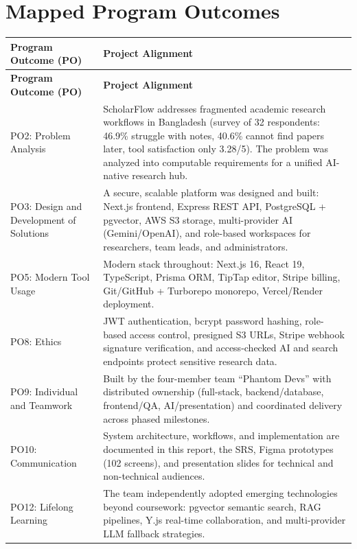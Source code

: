 \section*{Mapped Program Outcomes}

\begin{longtable}{|>{\raggedright\arraybackslash}p{3.6cm}|>{\raggedright\arraybackslash}p{11.6cm}|}
\hline
\textbf{Program Outcome (PO)} & \textbf{Project Alignment} \\
\hline
\endfirsthead
\hline
\textbf{Program Outcome (PO)} & \textbf{Project Alignment} \\
\hline
\endhead
PO2: Problem Analysis &
ScholarFlow addresses fragmented academic research workflows in Bangladesh
(survey of 32 respondents: 46.9\% struggle with notes, 40.6\% cannot find papers
later, tool satisfaction only 3.28/5). The problem was analyzed into computable
requirements for a unified AI-native research hub. \\
\hline
PO3: Design and Development of Solutions &
A secure, scalable platform was designed and built: Next.js frontend, Express
REST API, PostgreSQL + pgvector, AWS S3 storage, multi-provider AI
(Gemini/OpenAI), and role-based workspaces for researchers, team leads, and
administrators. \\
\hline
PO5: Modern Tool Usage &
Modern stack throughout: Next.js 16, React 19, TypeScript, Prisma ORM,
TipTap editor, Stripe billing, Git/GitHub + Turborepo monorepo, Vercel/Render
deployment. \\
\hline
PO8: Ethics &
JWT authentication, bcrypt password hashing, role-based access control,
presigned S3 URLs, Stripe webhook signature verification, and access-checked AI
and search endpoints protect sensitive research data. \\
\hline
PO9: Individual and Teamwork &
Built by the four-member team ``Phantom Devs'' with distributed ownership
(full-stack, backend/database, frontend/QA, AI/presentation) and coordinated
delivery across phased milestones. \\
\hline
PO10: Communication &
System architecture, workflows, and implementation are documented in this report,
the SRS, Figma prototypes (102 screens), and presentation slides for technical
and non-technical audiences. \\
\hline
PO12: Lifelong Learning &
The team independently adopted emerging technologies beyond coursework:
pgvector semantic search, RAG pipelines, Y.js real-time collaboration, and
multi-provider LLM fallback strategies. \\
\hline
\end{longtable}
